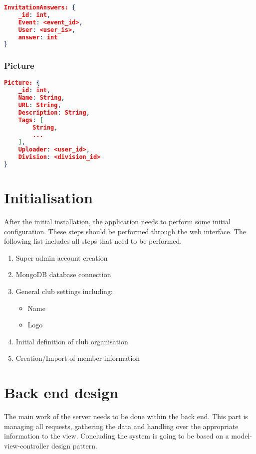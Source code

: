 \begin{lstlisting}[language=json, caption=\emph{InvitationAnswers}-document store]
InvitationAnswers: {
    _id: int,  
    Event: <event_id>,
    User: <user_is>,
    answer: int
}
\end{lstlisting}

\subsection{Picture}

\begin{lstlisting}[language=json, caption=\emph{Picture}-document store]
Picture: {
    _id: int,  
    Name: String,
    URL: String,
    Description: String,
    Tags: [
        String,
        ...
    ],
    Uploader: <user_id>,
    Division: <division_id>
}
\end{lstlisting}

\chapter{Initialisation}
After the initial installation, the application needs to perform some initial configuration. These steps should be performed through the web interface. The following list includes all steps that need to be performed.

\begin{enumerate}
    \item Super admin account creation
    \item MongoDB database connection
    \item General club settings including:
    \begin{itemize}
        \item Name
        \item Logo
    \end{itemize}
    \item Initial definition of club organisation
    \item Creation/Import of member information
\end{enumerate}

\chapter{Back end design}
The main work of the server needs to be done within the back end. This part is managing all requests, gathering the data and handling over the appropriate information to the view. Concluding the system is going to be based on a model-view-controller design pattern. 

